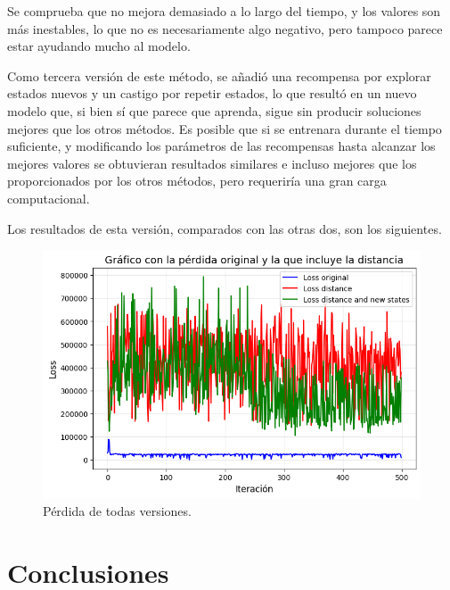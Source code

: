 \documentclass[letterpaper]{article} %
\begin{document}
Se comprueba que no mejora demasiado a lo largo del tiempo, y los valores son más inestables, lo que no es necesariamente algo negativo, pero tampoco parece estar ayudando mucho al modelo.

Como tercera versión de este método, se añadió una recompensa por explorar estados nuevos y un castigo por repetir estados, lo que resultó en un nuevo modelo que, si bien sí que parece que aprenda, sigue sin producir soluciones mejores que los otros métodos. Es posible que si se entrenara durante el 
tiempo suficiente, y modificando los parámetros de las recompensas hasta alcanzar los mejores valores se obtuvieran resultados similares e incluso mejores que los proporcionados por los otros métodos, pero requeriría una gran carga computacional.

Los resultados de esta versión, comparados con las otras dos, son los siguientes.
\begin{figure}[H]
    \centering
    \includegraphics[width=0.9\columnwidth]{FuN_3.png}
    \caption{Pérdida de todas versiones.\label{fig:FuN5}}
\end{figure}


\section{Conclusiones}


\end{document}
